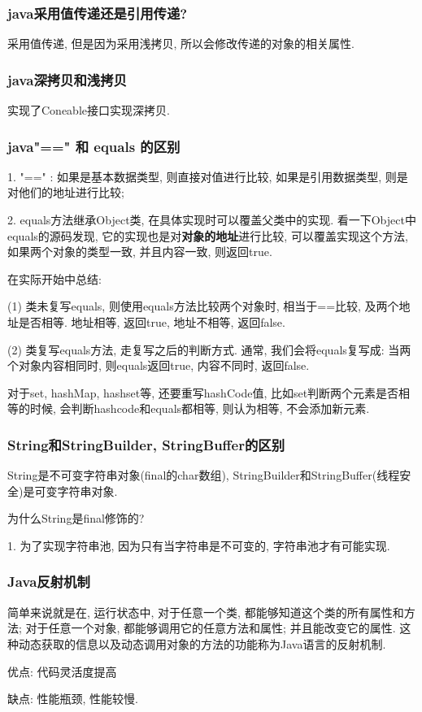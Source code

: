 \documentclass[UTF8]{ctexart}
\begin{document}
\subsubsection{java采用值传递还是引用传递?}
采用值传递, 但是因为采用浅拷贝, 所以会修改传递的对象的相关属性.
\subsubsection{java深拷贝和浅拷贝}
实现了Coneable接口实现深拷贝.
\subsubsection{java"==" 和 equals 的区别}
1. "==" : 如果是基本数据类型, 则直接对值进行比较, 如果是引用数据类型, 则是对他们的地址进行比较;
\par
2. equals方法继承Object类, 在具体实现时可以覆盖父类中的实现. 看一下Object中equals的源码发现, 它的实现也是对\textbf{对象的地址}进行比较, 可以覆盖实现这个方法, 如果两个对象的类型一致, 并且内容一致, 则返回true.
\par
在实际开始中总结:
\par
(1) 类未复写equals, 则使用equals方法比较两个对象时, 相当于==比较, 及两个地址是否相等. 地址相等, 返回true, 地址不相等, 返回false.
\par
(2) 类复写equals方法, 走复写之后的判断方式. 通常, 我们会将equals复写成: 当两个对象内容相同时, 则equals返回true, 内容不同时, 返回false.
\par
对于set, hashMap, hashset等, 还要重写hashCode值, 比如set判断两个元素是否相等的时候, 会判断hashcode和equals都相等, 则认为相等, 不会添加新元素.
\subsubsection{String和StringBuilder, StringBuffer的区别}
String是不可变字符串对象(final的char数组), StringBuilder和StringBuffer(线程安全)是可变字符串对象.
\par
为什么String是final修饰的?
\par
1. 为了实现字符串池, 因为只有当字符串是不可变的, 字符串池才有可能实现.
\subsubsection{Java反射机制}
简单来说就是在, 运行状态中, 对于任意一个类, 都能够知道这个类的所有属性和方法; 对于任意一个对象, 都能够调用它的任意方法和属性; 并且能改变它的属性. 这种动态获取的信息以及动态调用对象的方法的功能称为Java语言的反射机制.
\par
优点: 代码灵活度提高
\par
缺点: 性能瓶颈, 性能较慢.
\end{document}

